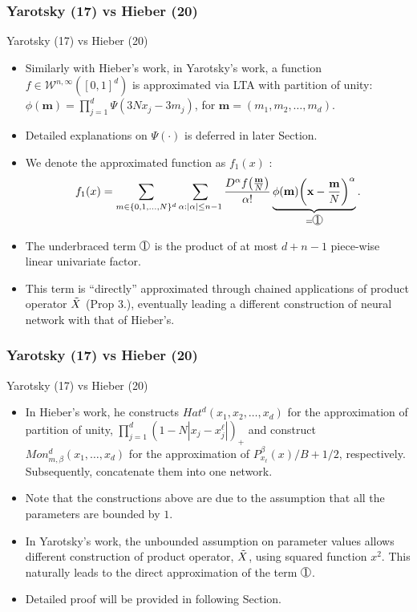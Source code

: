 \documentclass{if-beamer}
\newcommand*\circled[1]{\tikz[baseline=(char.base)]{
            \node[shape=circle,draw,inner sep=0.2pt] (char) {#1};}}
\begin{document}
\subsubsection{Yarotsky (17) vs Hieber (20)}
\begin{frame}{Yarotsky (17) vs Hieber (20)}
    \begin{itemize}
        \item Similarly with Hieber's work, in Yarotsky's work, a function $f\in\mathcal{W}^{n,\infty}([0,1]^{d})$ is approximated via LTA with partition of unity:
        $\phi(\textbf{m})=\prod_{j=1}^{d}\Psi(3Nx_{j}-3m_{j})$, for $\textbf{m}=(m_{1},m_{2},\dots,m_{d})$. 
        \item Detailed explanations on $\Psi(\cdot)$ is deferred in later Section.
        \item We denote the approximated function as $f_{1}(x)$ :
        \begin{equation*}
            f_{1}(x)=\sum_{m\in\{0,1,\dots,N\}^{d}}\sum_{\alpha:|\alpha|\leq n-1}\frac{D^{\alpha}f\big(\frac{\textbf{m}}{N}\big)}{\alpha!}\underbrace{\phi(\textbf{m})\bigg(\textbf{x}-\frac{\textbf{m}}{N}\bigg)^{\alpha}}_{=\circled{1}}.
        \end{equation*}
        \item The underbraced term $\circled{1}$ is the product of at most $d+n-1$ piece-wise linear univariate factor. 
        \item This term is ``directly'' approximated through chained applications of product operator $\Tilde{X}$ (Prop 3.), eventually leading a different construction of neural network with that of Hieber's. 
    \end{itemize}
\end{frame}

\subsubsection{Yarotsky (17) vs Hieber (20)}
\begin{frame}{Yarotsky (17) vs Hieber (20)}
    \begin{itemize}
        \item In Hieber's work, he constructs $Hat^{d}(x_{1},x_{2},\dots,x_{d})$ for the approximation of partition of unity, $\prod_{j=1}^{d}(1-N|x_j-x_j^{\ell}|)_{+}$ and 
        construct $Mon_{m,\beta}^{d}(x_{1},\dots,x_{d})$ for the approximation of $P_{x_{\ell}}^{\beta}(x)/B+1/2$, respectively. Subsequently, concatenate them into one network.
        \item Note that the constructions above are due to the assumption that all the parameters are bounded by $1$.
        \item In Yarotsky's work, the unbounded assumption on parameter values allows different construction of product operator, $\Tilde{X}$, using squared function $x^{2}$. This naturally leads to the direct approximation of the term $\circled{1}$.
        \item Detailed proof will be provided in following Section.
    \end{itemize}
\end{frame}
\end{document}
